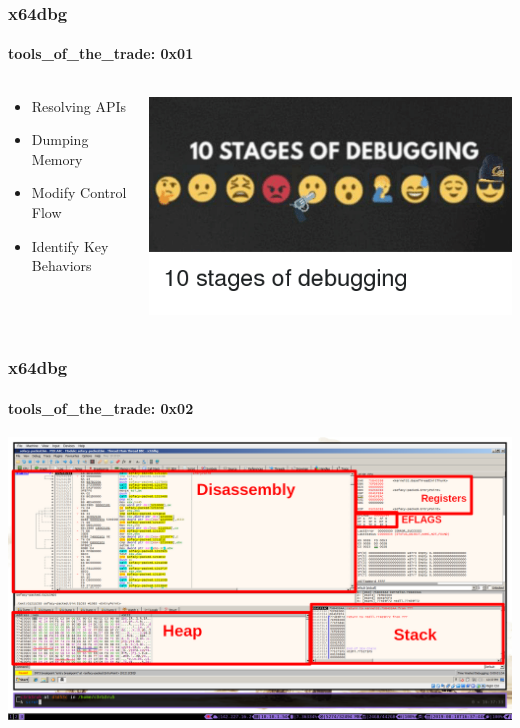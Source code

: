 \documentclass[aspectratio=169]{beamer}
\begin{document}
\begin{frame}
  \frametitle{x64dbg}
  \framesubtitle{tools\_of\_the\_trade: 0x01}
  \begin{columns}
    \begin{column}{.3\textwidth}
      \begin{itemize}
      \item{Resolving APIs}
      \item{Dumping Memory}
      \item{Modify Control Flow}
      \item{Identify Key Behaviors}
      \end{itemize}
    \end{column}
    \hfill
    \begin{column}{.7\textwidth}
      \begin{center}
        \includegraphics[scale=0.5]{stages-of-debugging-meme}
      \end{center}
    \end{column}
  \end{columns}
\end{frame}

\begin{frame}
  \frametitle{x64dbg}
  \framesubtitle{tools\_of\_the\_trade: 0x02}
  \begin{center}
    \includegraphics[scale=0.75]{x64dbg-overview}
  \end{center}
\end{frame}
\end{document}
